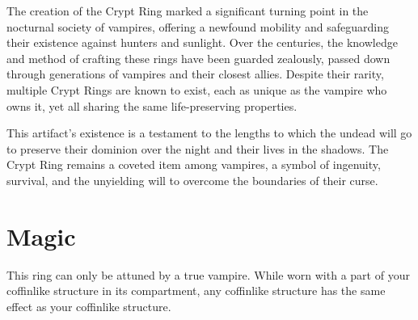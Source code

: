 The creation of the Crypt Ring marked a significant turning point in the nocturnal society of vampires, offering a newfound mobility and safeguarding their existence against hunters and sunlight. Over the centuries, the knowledge and method of crafting these rings have been guarded zealously, passed down through generations of vampires and their closest allies. Despite their rarity, multiple Crypt Rings are known to exist, each as unique as the vampire who owns it, yet all sharing the same life-preserving properties.

This artifact's existence is a testament to the lengths to which the undead will go to preserve their dominion over the night and their lives in the shadows. The Crypt Ring remains a coveted item among vampires, a symbol of ingenuity, survival, and the unyielding will to overcome the boundaries of their curse.

\section*{Magic}
This ring can only be attuned by a true vampire. While worn with a part of your coffinlike structure in its compartment, any coffinlike structure has the same effect as your coffinlike structure.